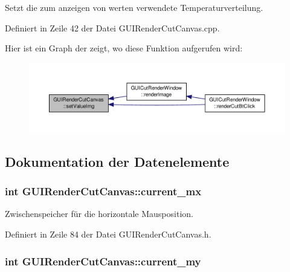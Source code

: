 Setzt die zum anzeigen von werten verwendete Temperaturverteilung. 



Definiert in Zeile 42 der Datei G\-U\-I\-Render\-Cut\-Canvas.\-cpp.



Hier ist ein Graph der zeigt, wo diese Funktion aufgerufen wird\-:\nopagebreak
\begin{figure}[H]
\begin{center}
\leavevmode
\includegraphics[width=350pt]{classGUIRenderCutCanvas_a88c49bc069d6e1a40b68dcfce8fd9bf7_icgraph}
\end{center}
\end{figure}




\subsection{Dokumentation der Datenelemente}
\hypertarget{classGUIRenderCutCanvas_af6d75eea1254d03ed36a07a865bf48c1}{
\subsubsection[{current\-\_\-mx}]{\setlength{\rightskip}{0pt plus 5cm}int G\-U\-I\-Render\-Cut\-Canvas\-::current\-\_\-mx\hspace{0.3cm}{\ttfamily [private]}}}\label{classGUIRenderCutCanvas_af6d75eea1254d03ed36a07a865bf48c1}


Zwischenspeicher für die horizontale Mausposition. 



Definiert in Zeile 84 der Datei G\-U\-I\-Render\-Cut\-Canvas.\-h.

\hypertarget{classGUIRenderCutCanvas_a349deb05f26285eaf8207cbe45bf6603}{
\subsubsection[{current\-\_\-my}]{\setlength{\rightskip}{0pt plus 5cm}int G\-U\-I\-Render\-Cut\-Canvas\-::current\-\_\-my\hspace{0.3cm}{\ttfamily [private]}}}\label{classGUIRenderCutCanvas_a349deb05f26285eaf8207cbe45bf6603}


